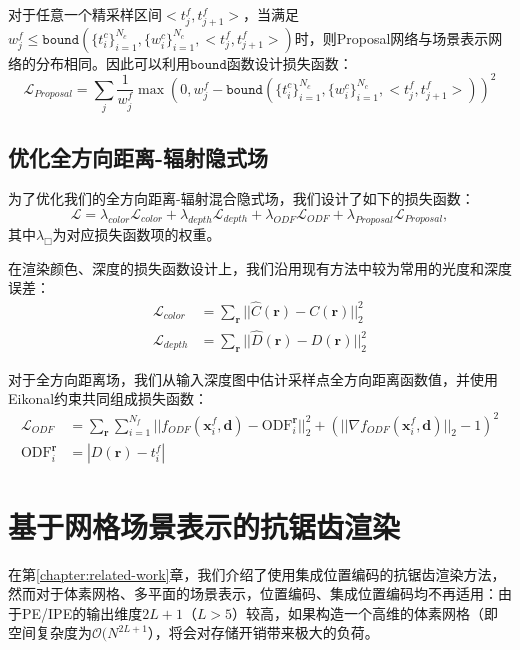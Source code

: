 对于任意一个精采样区间$<t_{j}^f, t_{j+1}^f>$，当满足$w_j^f\leq \mathtt{bound}(\{t_i^c\}_{i=1}^{N_c}, \{w_i^c\}_{i=1}^{N_c}, <t_{j}^f, t_{j+1}^f>)$时，则Proposal网络与场景表示网络的分布相同。因此可以利用$\mathtt{bound}$函数设计损失函数：
\begin{equation}
    \mathcal{L}_{Proposal}=\sum_j\frac{1}{w_j^f}\max(0, w_j^f- \mathtt{bound}(\{t_i^c\}_{i=1}^{N_c}, \{w_i^c\}_{i=1}^{N_c}, <t_{j}^f, t_{j+1}^f>))^2
\end{equation}

\subsection{优化全方向距离-辐射隐式场}
为了优化我们的全方向距离-辐射混合隐式场，我们设计了如下的损失函数：
\begin{equation}
    \mathcal{L} = \lambda_{color}\mathcal{L}_{color} + \lambda_{depth}\mathcal{L}_{depth}+\lambda_{ODF}\mathcal{L}_{ODF}+\lambda_{Proposal}\mathcal{L}_{Proposal},
\end{equation}
其中$\lambda_{\Box}$为对应损失函数项的权重。

在渲染颜色、深度的损失函数设计上，我们沿用现有方法\cite{mildenhall_nerf_2020}中较为常用的光度和深度误差：
\begin{align}
    \mathcal{L}_{color} &= \sum_{\mathbf{r}}||\hat{C}(\mathbf{r}) - C(\mathbf{r})||_2^2\\
    \mathcal{L}_{depth} &= \sum_{\mathbf{r}}||\hat{D}(\mathbf{r}) - D(\mathbf{r})||_2^2
\end{align}

对于全方向距离场，我们从输入深度图中估计采样点全方向距离函数值，并使用Eikonal约束\cite{gropp_implicit_2020}共同组成损失函数：
\begin{align}
    \mathcal{L}_{ODF} &= \sum_{\mathbf{r}}\sum_{i=1}^{N_f}||f_{ODF}(\mathbf{x}_i^f, \mathbf{d}) - \text{ODF}_i^{\mathbf{r}}||_2^2 + (||\nabla f_{ODF}(\mathbf{x}_i^f, \mathbf{d})||_2-1)^2\\
    \text{ODF}_i^{\mathbf{r}} &= |D(\mathbf{r}) - t_i^f|
\end{align}

\section{基于网格场景表示的抗锯齿渲染}
\label{sec: omninerf-anti-aliasing}
在第\ref{chapter:related-work}章，我们介绍了使用集成位置编码的抗锯齿渲染方法\cite{barron_mip-nerf_2021, barron_mip-nerf_2022}，然而对于体素网格、多平面的场景表示，位置编码、集成位置编码均不再适用：由于PE/IPE的输出维度$2L+1$（$L>5$）较高，如果构造一个高维的体素网格（即空间复杂度为$\mathcal{O}(N^{2L+1}$），将会对存储开销带来极大的负荷。

